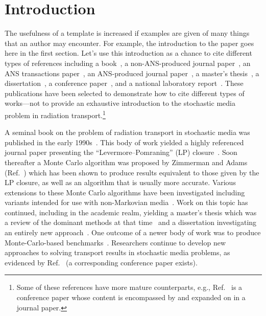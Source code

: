 \documentclass{nseJournal}
\begin{document}
\section{Introduction}

The usefulness of a template is increased if examples are given of many things that an author may encounter.
For example, the introduction to the paper goes here in the first section.
Let's use this introduction as a chance to cite different types of references including a book~\cite{Pomraning1991book}, a non-ANS-produced journal paper~\cite{AdamsJQSRT1989}, an ANS transactions paper~\cite{ZimmermanANS1991}, an ANS-produced journal paper~\cite{DonovanNSE2003}, a master's thesis~\cite{Vasques2005thesis}, a dissertation~\cite{Fichtl2009dissertation}, a conference paper~\cite{BrantleyMC2009Incident}, and a national laboratory report~\cite{PautzSAND2017AMClosurePres}.
These publications have been selected to demonstrate how to cite different types of works---not to provide an exhaustive introduction to the stochastic media problem in radiation transport.\footnote{Some of these references have more mature counterparts, e.g., Ref.~\cite{BrantleyMC2009Incident} is a conference paper whose content is encompassed by and expanded on in a journal paper.}

A seminal book on the problem of radiation transport in stochastic media was published in the early 1990s~\cite{Pomraning1991book}.
This body of work yielded a highly referenced journal paper presenting the ``Levermore--Pomraning'' (LP) closure~\cite{AdamsJQSRT1989}.
Soon thereafter a Monte Carlo algorithm was proposed by Zimmerman and Adams (Ref.~\cite{ZimmermanANS1991}) which has been shown to produce results equivalent to those given by the LP closure, as well as an algorithm that is usually more accurate.
Various extensions to these Monte Carlo algorithms have been investigated including variants intended for use with non-Markovian media~\cite{DonovanNSE2003}.
Work on this topic has continued, including in the academic realm, yielding a master's thesis which was a review of the dominant methods at that time~\cite{Vasques2005thesis} and a dissertation investigating an entirely new approach~\cite{Fichtl2009dissertation}.
One outcome of a newer body of work was to produce Monte-Carlo-based benchmarks~\cite{BrantleyMC2009Incident}.
Researchers continue to develop new approaches to solving transport results in stochastic media problems, as evidenced by Ref.~\cite{PautzSAND2017AMClosurePres} (a corresponding conference paper exists).
\end{document}
